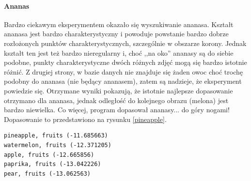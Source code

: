 \documentclass[a4paper,12pt,leqno]{article}
\begin{document}
\paragraph{Ananas}
Bardzo ciekawym eksperymentem okazało się wyszukiwanie ananasa. Kształt ananasa jest bardzo charakterystyczny i powoduje powstanie bardzo
dobrze rozłożonych punktów charakterystycznych, szczególnie w obszarze korony. Jednak kształt ten jest też bardzo nieregularny i, choć
,,na oko'' ananasy są do siebie podobne, punkty charakterystyczne dwóch różnych zdjęć mogą się bardzo istotnie różnić. Z drugiej strony,
w bazie danych nie znajduje się żaden owoc choć trochę podobny do ananasa (nie będący ananasem), zatem są nadzieje, że eksperyment powiedzie
się. Otrzymane wyniki pokazują, że istotnie najlepsze dopasowanie otrzymano dla ananasa, jednak odległość do kolejnego obrazu (melona) jest
bardzo niewielka. Co więcej, program dopasował ananasy... do góry nogami! Dopasowanie to przedstawiono na rysunku \ref{pineapple}.
\begin{verbatim}
pineapple, fruits (-11.685663)
watermelon, fruits (-12.371205)
apple, fruits (-12.665856)
paprika, fruits (-13.042226)
pear, fruits (-13.062563)
\end{verbatim}
\end{document}
